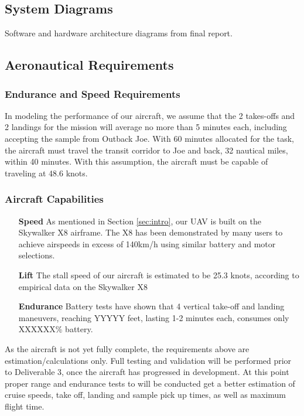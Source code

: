 \subsection{System Diagrams}
Software and hardware architecture diagrams from final report.

\subsection{Aeronautical Requirements}
\subsubsection{Endurance and Speed Requirements}
In modeling the performance of our aircraft, we assume that the 2 takes-offs and 2 landings for the mission will average no more than 5 minutes each, including accepting the sample from Outback Joe. With 60 minutes allocated for the task, the aircraft must travel the transit corridor to Joe and back, 32 nautical miles, within 40 minutes. With this assumption, the aircraft must be capable of traveling at 48.6 knots. 

\subsubsection{Aircraft Capabilities}
\begin{itemize}
	\item[\textbf{Speed}] As mentioned in Section \ref{sec:intro}, our UAV is built on the Skywalker X8 airframe. The X8 has been demonstrated by many users to achieve airspeeds in excess of 140km/h using similar battery and motor selections.
	\item[\textbf{Lift}] The stall speed of our aircraft is estimated to be 25.3 knots, according to empirical data on the Skywalker X8
	\item[\textbf{Endurance}] Battery tests have shown that 4 vertical take-off and landing maneuvers, reaching YYYYY feet, lasting 1-2 minutes each, consumes only XXXXXX\% battery. 
\end{itemize}

As the aircraft is not yet fully complete, the requirements above are estimation/calculations only. Full testing and validation will be performed prior to Deliverable 3, once the aircraft has progressed in development. At this point proper range and endurance tests to will be conducted get a better estimation of cruise speeds, take off, landing and sample pick up times, as well as maximum flight time.

